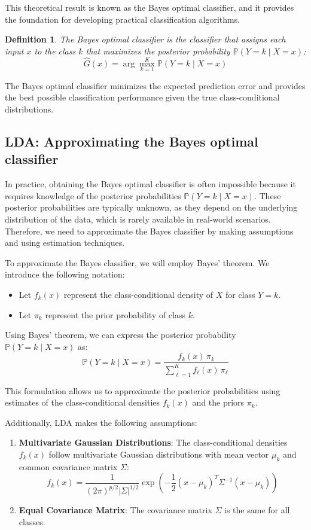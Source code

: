 \documentclass[a4paper,12pt]{article}
\newtheorem{definition}{Definition}
\begin{document}
This theoretical result is known as the Bayes optimal classifier, and it provides the foundation for developing practical classification algorithms.

\begin{definition}
The Bayes optimal classifier is the classifier that assigns each input $x$ to the class $k$ that maximizes the posterior probability $\mathbb{P}(Y = k \mid X = x)$:
\[
\hat{G}(x) = \arg\max_{k=1}^K \mathbb{P}(Y = k \mid X = x)
\]
\end{definition}
The Bayes optimal classifier minimizes the expected prediction error and provides the best possible classification performance given the true class-conditional distributions.

\subsection{LDA: Approximating the Bayes optimal classifier}

In practice, obtaining the Bayes optimal classifier is often impossible because it requires knowledge of the posterior probabilities $\mathbb{P}(Y = k \mid X = x)$. These posterior probabilities are typically unknown, as they depend on the underlying distribution of the data, which is rarely available in real-world scenarios. Therefore, we need to approximate the Bayes classifier by making assumptions and using estimation techniques.

To approximate the Bayes classifier, we will employ Bayes' theorem. We introduce the following notation:
\begin{itemize}
    \item Let $f_k(x)$ represent the class-conditional density of $X$ for class $Y = k$.
    \item Let $\pi_k$ represent the prior probability of class $k$.
\end{itemize}

Using Bayes' theorem, we can express the posterior probability $\mathbb{P}(Y = k \mid X = x)$ as:
\[
\mathbb{P}(Y = k \mid X = x) = \frac{f_k(x) \, \pi_k}{\sum_{\ell=1}^K f_\ell(x) \, \pi_\ell}
\]

This formulation allows us to approximate the posterior probabilities using estimates of the class-conditional densities $f_k(x)$ and the priors $\pi_k$.

Additionally, LDA makes the following assumptions:

\begin{enumerate}
    \item \textbf{Multivariate Gaussian Distributions}: The class-conditional densities $f_k(x)$ follow multivariate Gaussian distributions with mean vector $\mu_k$ and common covariance matrix $\Sigma$:
    \[
    f_k(x) = \frac{1}{(2\pi)^{p/2} |\Sigma|^{1/2}} \exp\left(-\frac{1}{2}(x - \mu_k)^T \Sigma^{-1} (x - \mu_k)\right)
    \]
    \item \textbf{Equal Covariance Matrix}: The covariance matrix $\Sigma$ is the same for all classes.
\end{enumerate}
\end{document}
